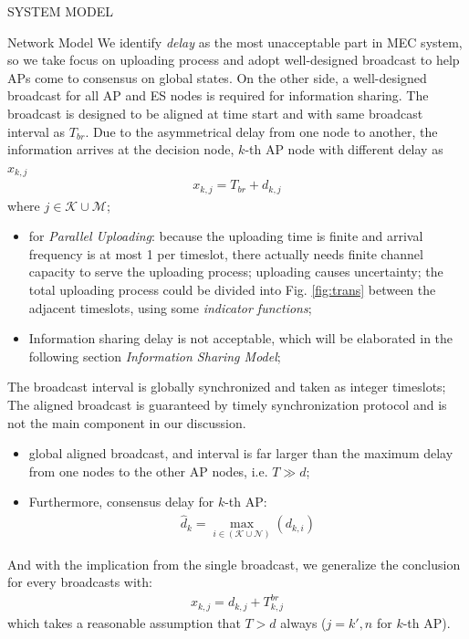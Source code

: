 \documentclass[10pt, conference, letterpaper]{IEEEtran}
\newcommand{\apSet}{\mathcal{K}}
\newcommand{\esSet}{\mathcal{M}}
\begin{document}
\begin{section}{SYSTEM MODEL}
\begin{subsection}{Network Model}
            We identify \emph{delay} as the most unacceptable part in MEC system, so we take focus on uploading process and adopt well-designed broadcast to help APs come to consensus on global states.
            On the other side, a well-designed broadcast for all AP and ES nodes is required for information sharing. The broadcast is designed to be aligned at time start and with same broadcast interval as $T_{br}$. Due to the asymmetrical delay from one node to another, the information arrives at the decision node, $k$-th AP node with different delay as $x_{k,j}$
            \begin{align}
                x_{k,j} = T_{br} + d_{k,j}
            \end{align}
            where $j \in \apSet \cup \esSet$;
            \begin{itemize}
                \item for \emph{Parallel Uploading}: because the uploading time is finite and arrival frequency is at most 1 per timeslot, there actually needs finite channel capacity to serve the uploading process;
                uploading causes uncertainty;
                the total uploading process could be divided into Fig. \ref{fig:trans} between the adjacent timeslots, using some \emph{indicator functions};
                \item Information sharing delay is not acceptable, which will be elaborated in the following section \emph{Information Sharing Model};
            \end{itemize}

            The broadcast interval is globally synchronized and taken as integer timeslots;
            The aligned broadcast is guaranteed by timely synchronization protocol and is not the main component in our discussion.
            \begin{itemize}
                \item global aligned broadcast, and interval is far larger than the maximum delay from one nodes to the other AP nodes, i.e. $T \gg d$;
                \item Furthermore, consensus delay for $k$-th AP:
                    \begin{align}
                        \hat{d}_k = \max_{i\in(\mathcal{K} \cup \mathcal{N})}(d_{k,i})
                    \end{align}
            \end{itemize}
            And with the implication from the single broadcast, we generalize the conclusion for every broadcasts with:
            \begin{align}
                x_{k,j} = d_{k,j} + T^{br}_{k,j}
            \end{align}
            which takes a reasonable assumption that $T>d$ always ($j=k',n$ for $k$-th AP).
        \end{subsection}


\end{section}
\end{document}
